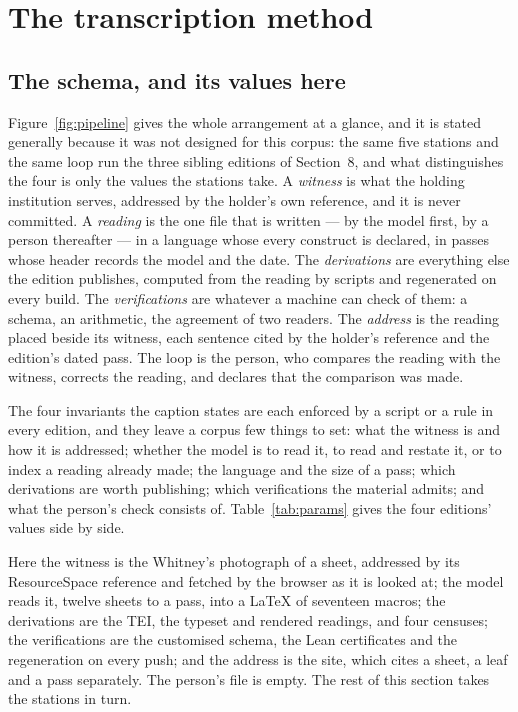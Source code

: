 \documentclass[11pt]{article}
\begin{document}
\section{The transcription method}



\subsection{The schema, and its values here}

Figure~\ref{fig:pipeline} gives the whole arrangement at a glance, and it is
stated generally because it was not designed for this corpus: the same five
stations and the same loop run the three sibling editions of Section~8, and
what distinguishes the four is only the values the stations take. A
\emph{witness} is what the holding institution serves, addressed by the
holder's own reference, and it is never committed. A \emph{reading} is the one
file that is written --- by the model first, by a person thereafter --- in a
language whose every construct is declared, in passes whose header records
the model and the date. The \emph{derivations} are everything else the
edition publishes, computed from the reading by scripts and regenerated on
every build. The \emph{verifications} are whatever a machine can check of
them: a schema, an arithmetic, the agreement of two readers. The
\emph{address} is the reading placed beside its witness, each sentence cited
by the holder's reference and the edition's dated pass. The loop is the
person, who compares the reading with the witness, corrects the reading, and
declares that the comparison was made.

The four invariants the caption states are each enforced by a script or a
rule in every edition, and they leave a corpus few things to set: what the
witness is and how it is addressed; whether the model is to read it, to read
and restate it, or to index a reading already made; the language and the
size of a pass; which derivations are worth publishing; which verifications
the material admits; and what the person's check consists of.
Table~\ref{tab:params} gives the four editions' values side by side.

Here the witness is the Whitney's photograph of a sheet, addressed by its
ResourceSpace reference and fetched by the browser as it is looked at; the
model reads it, twelve sheets to a pass, into a LaTeX of seventeen macros; the
derivations are the TEI, the typeset and rendered readings, and four censuses;
the verifications are the customised schema, the Lean certificates and the
regeneration on every push; and the address is the site, which cites a sheet,
a leaf and a pass separately. The person's file is empty. The rest of this
section takes the stations in turn.
\end{document}
